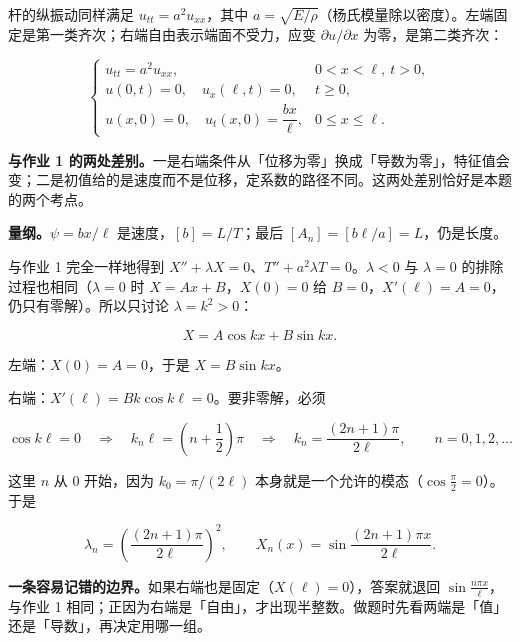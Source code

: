 


杆的纵振动同样满足 $u_{tt}=a^2u_{xx}$，其中 $a=\sqrt{E/\rho}$（杨氏模量除以密度）。左端固定是第一类齐次；右端自由表示端面不受力，应变 $\partial u/\partial x$ 为零，是第二类齐次：

\[
\begin{cases}
u_{tt}=a^2u_{xx}, & 0<x<\ell,\ t>0,\\[2pt]
u(0,t)=0,\quad u_x(\ell,t)=0, & t\ge0,\\[2pt]
u(x,0)=0,\quad u_t(x,0)=\dfrac{bx}{\ell}, & 0\le x\le\ell .
\end{cases}
\]

\textbf{与作业 1 的两处差别。}一是右端条件从「位移为零」换成「导数为零」，特征值会变；二是初值给的是速度而不是位移，定系数的路径不同。这两处差别恰好是本题的两个考点。

\textbf{量纲。}$\psi=bx/\ell$ 是速度，$[b]=L/T$；最后 $[A_n]=[b\ell/a]=L$，仍是长度。


与作业 1 完全一样地得到 $X''+\lambda X=0$、$T''+a^2\lambda T=0$。$\lambda<0$ 与 $\lambda=0$ 的排除过程也相同（$\lambda=0$ 时 $X=Ax+B$，$X(0)=0$ 给 $B=0$，$X'(\ell)=A=0$，仍只有零解）。所以只讨论 $\lambda=k^2>0$：

\[
X=A\cos kx+B\sin kx .
\]

左端：$X(0)=A=0$，于是 $X=B\sin kx$。

右端：$X'(\ell)=Bk\cos k\ell=0$。要非零解，必须

\[
\cos k\ell=0
\quad\Longrightarrow\quad
k_n\ell=\left(n+\frac12\right)\pi
\quad\Longrightarrow\quad
k_n=\frac{(2n+1)\pi}{2\ell},
\qquad n=0,1,2,\dots
\]

这里 $n$ 从 $0$ 开始，因为 $k_0=\pi/(2\ell)$ 本身就是一个允许的模态（$\cos\frac{\pi}{2}=0$）。于是

\[
\lambda_n=\left(\frac{(2n+1)\pi}{2\ell}\right)^2,
\qquad
X_n(x)=\sin\frac{(2n+1)\pi x}{2\ell}.
\]

\textbf{一条容易记错的边界。}如果右端也是固定（$X(\ell)=0$），答案就退回 $\sin\frac{n\pi x}{\ell}$，与作业 1 相同；正因为右端是「自由」，才出现半整数。做题时先看两端是「值」还是「导数」，再决定用哪一组。

